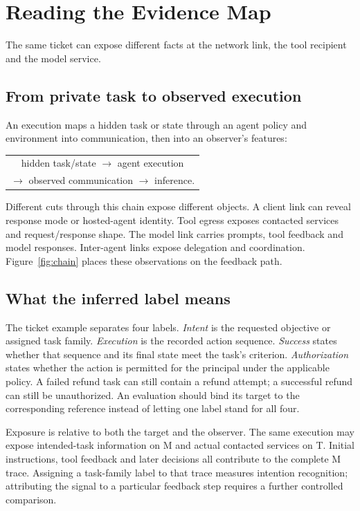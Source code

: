 \section{Reading the Evidence Map}\label{sec:taxonomy}
The same ticket can expose different facts at the network link, the tool recipient and the model service.
\subsection{From private task to observed execution}
An execution maps a hidden task or state through an agent policy and environment into communication, then into an observer's features:
\begin{center}
\begin{tabular}{c}
hidden task/state $\longrightarrow$ agent execution\\
$\longrightarrow$ observed communication $\longrightarrow$ inference.
\end{tabular}
\end{center}
Different cuts through this chain expose different objects. A client link can reveal response mode or hosted-agent identity. Tool egress exposes contacted services and request/response shape. The model link carries prompts, tool feedback and model responses. Inter-agent links expose delegation and coordination. Figure~\ref{fig:chain} places these observations on the feedback path.





\subsection{What the inferred label means}
The ticket example separates four labels. \emph{Intent} is the requested objective or assigned task family. \emph{Execution} is the recorded action sequence. \emph{Success} states whether that sequence and its final state meet the task's criterion. \emph{Authorization} states whether the action is permitted for the principal under the applicable policy. A failed refund task can still contain a refund attempt; a successful refund can still be unauthorized. An evaluation should bind its target to the corresponding reference instead of letting one label stand for all four.

Exposure is relative to both the target and the observer. The same execution may expose intended-task information on M and actual contacted services on T. Initial instructions, tool feedback and later decisions all contribute to the complete M trace. Assigning a task-family label to that trace measures intention recognition; attributing the signal to a particular feedback step requires a further controlled comparison.


